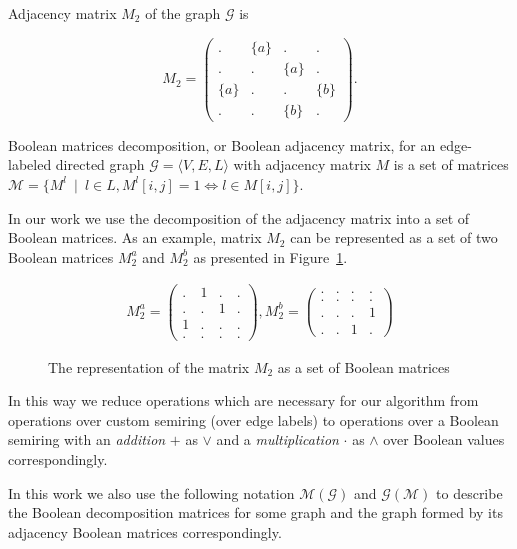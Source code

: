Adjacency matrix $M_2$ of the graph $\mathcal{G}$ is

$$
    M_2 =
    \begin{pmatrix}
    . & \{a\} & . & .     \\
    . & . & \{a\} & .     \\
    \{a\} & . & . & \{b\} \\
    . & . & \{b\} & .
    \end{pmatrix}.
$$

\begin{definition}
Boolean matrices decomposition, or Boolean adjacency matrix,
for an edge-labeled directed graph $\mathcal{G} =
\langle V,E,L \rangle$ with adjacency matrix $M$ is a set of matrices $\mathcal{M} = \{ M^l~\mid~l \in L,M^l[i,j] = 1 \iff l \in M[i,j]\}$.
\end{definition}

In our work we use the decomposition of the adjacency matrix into a set of Boolean matrices. As an example, matrix $M_2$ can be represented as a set of two Boolean matrices $M_2^a$ and $M_2^b$ as presented in Figure~\ref{fig:boolean_decomposition_of_graph}.

\begin{figure}[h]
    \centering
\begin{align}
M_2^{a} =
\begin{pmatrix}
    . & 1 & . & .   \\
    . & . & 1 & .   \\
    1 & . & . & .   \\
    . & . & . & .
\end{pmatrix},
M_2^{b} =
\begin{pmatrix}
    . & . & . & .   \\
    . & . & . & .   \\
    . & . & . & 1   \\
    . & . & 1 & .
\end{pmatrix}
\end{align}
   \caption{The representation of the matrix $M_2$ as a set of Boolean matrices}
\label{fig:boolean_decomposition_of_graph}
\end{figure}

In this way we reduce operations which are necessary for our algorithm from
operations over custom semiring (over edge labels) to operations over a Boolean
semiring with an \textit{addition} $+$ as $\lor$ and a \textit{multiplication}
$\cdot$ as $\land$ over Boolean values correspondingly.

In this work we also use the following notation $\mathcal{M}(\mathcal{G})$ and
$\mathcal{G}(\mathcal{M})$ to describe the Boolean decomposition matrices for some graph
and the graph formed by its adjacency Boolean matrices correspondingly.

